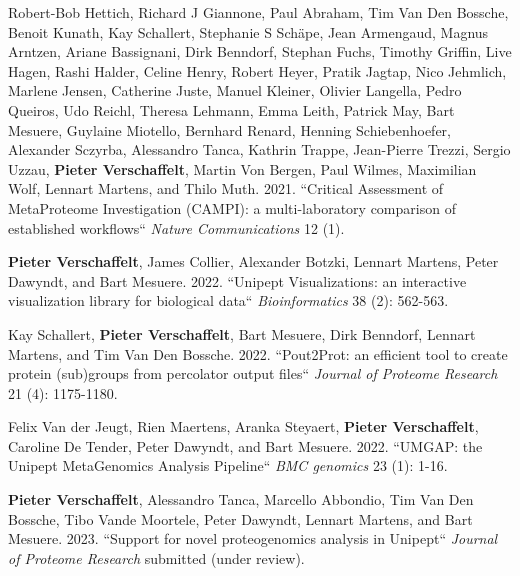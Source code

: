Robert-Bob Hettich, Richard J Giannone, Paul Abraham, Tim Van Den Bossche, Benoit Kunath, Kay Schallert, Stephanie S Schäpe, Jean Armengaud, Magnus Arntzen, Ariane Bassignani, Dirk Benndorf, Stephan Fuchs, Timothy Griffin, Live Hagen, Rashi Halder, Celine Henry, Robert Heyer, Pratik Jagtap, Nico Jehmlich, Marlene Jensen, Catherine Juste, Manuel Kleiner, Olivier Langella, Pedro Queiros, Udo Reichl, Theresa Lehmann, Emma Leith, Patrick May, Bart Mesuere, Guylaine Miotello, Bernhard Renard, Henning Schiebenhoefer, Alexander Sczyrba, Alessandro Tanca, Kathrin Trappe, Jean-Pierre Trezzi, Sergio Uzzau, \textbf{Pieter Verschaffelt}, Martin Von Bergen, Paul Wilmes, Maximilian Wolf, Lennart Martens, and Thilo Muth. 2021. ``Critical Assessment of MetaProteome Investigation (CAMPI): a multi-laboratory comparison of established workflows`` \textit{Nature Communications} 12 (1).

\textbf{Pieter Verschaffelt}, James Collier, Alexander Botzki, Lennart Martens, Peter Dawyndt, and Bart Mesuere. 2022. ``Unipept Visualizations: an interactive visualization library for biological data`` \textit{Bioinformatics} 38 (2): 562-563.

Kay Schallert, \textbf{Pieter Verschaffelt}, Bart Mesuere, Dirk Benndorf, Lennart Martens, and Tim Van Den Bossche. 2022. ``Pout2Prot: an efficient tool to create protein (sub)groups from percolator output files`` \textit{Journal of Proteome Research} 21 (4): 1175-1180.

Felix Van der Jeugt, Rien Maertens, Aranka Steyaert, \textbf{Pieter Verschaffelt}, Caroline De Tender, Peter Dawyndt, and Bart Mesuere. 2022. ``UMGAP: the Unipept MetaGenomics Analysis Pipeline`` \textit{BMC genomics} 23 (1): 1-16.

\textbf{Pieter Verschaffelt}, Alessandro Tanca, Marcello Abbondio, Tim Van Den Bossche, Tibo Vande Moortele, Peter Dawyndt, Lennart Martens, and Bart Mesuere. 2023. ``Support for novel proteogenomics analysis in Unipept`` \textit{Journal of Proteome Research} submitted (under review).

